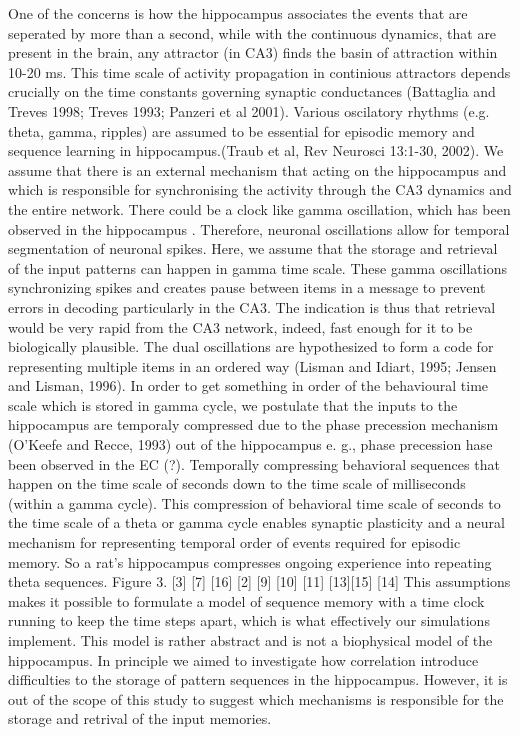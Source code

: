 \documentclass[utf8]{frontiersSCNS} %
\begin{document}
One of the concerns is how the hippocampus associates the events that are seperated by more than a second, while with the continuous dynamics, that are present in the brain, any attractor (in CA3) finds the basin of attraction within 10-20 ms. This time scale of activity propagation in continious attractors depends crucially on the time constants governing synaptic conductances (Battaglia and Treves 1998; Treves 1993; Panzeri et al 2001). 
%
Various oscilatory rhythms (e.g. theta, gamma, ripples) are assumed to be essential for episodic memory and sequence learning in hippocampus.(Traub et al, Rev Neurosci 13:1-30, 2002).
%
We assume that there is an external mechanism that acting on the hippocampus and which is responsible for synchronising the activity through the CA3 dynamics and the entire network. There could be a clock like gamma oscillation, which has been observed in the hippocampus \cite{jensen2007human}. Therefore, neuronal oscillations allow for temporal segmentation of neuronal spikes. 
%
Here, we assume that the storage and retrieval of the input patterns can happen in gamma time scale.
%
These gamma oscillations synchronizing spikes and creates pause between items in a message to prevent errors in decoding particularly in the CA3. 
%
The indication is thus that retrieval would be very rapid from the CA3 network, indeed, fast enough for it to be biologically plausible.
%
The dual oscillations are hypothesized to form a code for representing multiple items in an ordered way (Lisman and Idiart, 1995; Jensen and Lisman, 1996). 
%
In order to get something in order of the behavioural time scale which is stored in gamma cycle, we postulate that the inputs to the hippocampus are temporaly compressed due to the phase precession mechanism (O'Keefe and Recce, 1993) out of the hippocampus e. g., phase precession hase been observed in the EC (?). 
%
Temporally compressing behavioral sequences that happen on the time scale of seconds down to the time scale of milliseconds (within a gamma cycle). This compression of behavioral time scale of seconds to the time scale of a theta or gamma cycle enables synaptic plasticity and a neural mechanism for representing temporal order of events required for episodic memory. So a rat's hippocampus compresses ongoing experience into repeating theta sequences. Figure 3. [3] [7] [16] [2] [9] [10] [11] [13][15] [14]
%
This assumptions makes it possible to formulate a model of sequence memory with a time clock running to keep the time steps apart, which is what effectively our simulations implement. 
%
This model is rather abstract and is not a biophysical model of the hippocampus. In principle we aimed to investigate how correlation introduce difficulties to the storage of pattern sequences in the hippocampus.
However, it is out of the scope of this study to suggest which mechanisms is responsible for the storage and retrival of the input memories.   
%
\end{document}
